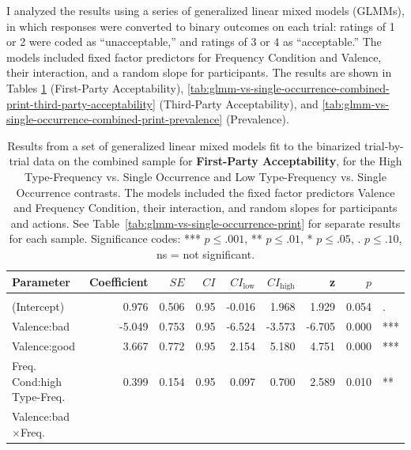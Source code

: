 \documentclass[
]{article}
\begin{document}
I analyzed the results using a series of generalized linear mixed models (GLMMs), in which responses were converted to binary outcomes on each trial: ratings of 1 or 2 were coded as ``unacceptable,'' and ratings of 3 or 4 as ``acceptable.'' The models included fixed factor predictors for Frequency Condition and Valence, their interaction, and a random slope for participants. The results are shown in Tables \ref{tab:glmm-vs-single-occurrence-combined-print-first-party-acceptability} (First-Party Acceptability), \ref{tab:glmm-vs-single-occurrence-combined-print-third-party-acceptability} (Third-Party Acceptability), and \ref{tab:glmm-vs-single-occurrence-combined-print-prevalence} (Prevalence).

\begin{table}
\centering\centering
\caption{\label{tab:glmm-vs-single-occurrence-combined-print-first-party-acceptability}Results from a set of generalized linear mixed models fit to the binarized trial-by-trial data on the combined sample for \textbf{First-Party Acceptability}, for the High Type-Frequency vs. Single Occurrence and Low Type-Frequency vs. Single Occurrence contrasts. The models included the fixed factor predictors Valence and Frequency Condition, their interaction, and random slopes for participants and actions. See Table~\ref{tab:glmm-vs-single-occurrence-print} for separate results for each sample. Significance codes: *** $p \leq .001$, ** $p \leq .01$, * $p \leq .05$, . $p \leq .10$, ns = not significant.}
\centering
\begin{tabular}[t]{lrrrrrrrl}
\toprule
Parameter & Coefficient & $\mathit{SE}$ & $C$$I$ & $CI_{\text{low}}$ & $CI_{\text{high}}$ & z & $p$ &  \\
\midrule
\addlinespace[0.3em]
\multicolumn{9}{l}{\textbf{High Type-Frequency (vs. Single Occurrence)}}\\
\hspace{1em}(Intercept) & 0.976 & 0.506 & 0.95 & -0.016 & 1.968 & 1.929 & 0.054 & .\\
\hspace{1em}Valence:bad & -5.049 & 0.753 & 0.95 & -6.524 & -3.573 & -6.705 & 0.000 & ***\\
\hspace{1em}Valence:good & 3.667 & 0.772 & 0.95 & 2.154 & 5.180 & 4.751 & 0.000 & ***\\
Freq.
Cond:high
\hspace{1em}Type-Freq. & 0.399 & 0.154 & 0.95 & 0.097 & 0.700 & 2.589 & 0.010 & **\\
Valence:bad$\times$Freq.
$$
\end{tabular}
\end{table}
\end{document}
